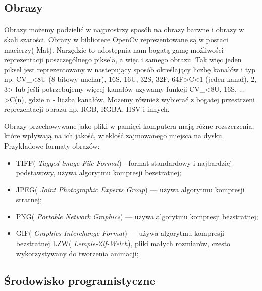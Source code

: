 \documentclass[a4paper,12pt]{article}
\begin{document}
	\subsection{Obrazy}
	    \paragraph{} Obrazy możemy podzielić w najprostrzy sposób na obrazy barwne i obrazy w skali szarości. Obrazy w bibliotece OpenCv reprezentowane są w postaci macierzy( Mat). Narzędzie to udostępnia nam bogatą gamę możliwości reprezentacji poszczególnego piksela, a więc i samego obrazu. Tak więc jeden piksel jest reprezentowany w nastepujący sposób określający liczbę kanałów i typ np. CV\_<8U (8-bitowy unchar), 16S, 16U, 32S, 32F, 64F>C<1 (jeden kanał), 2, 3> lub jeśli potrzebujemy więcej kanałów uzywamy funkcji CV\_<8U, 16S, ... >C(n), gdzie n - liczba kanałów. Możemy również wybierać z bogatej przestrzeni reprezentacji obrazu np. RGB, RGBA, HSV i innych. \par
	    Obrazy przechowywane jako pliki w pamięci komputera mają różne rozszerzenia, które wpływają na ich jakość, wieklość zajmowanego miejsca na dysku. Przykładowe formaty obrazów: 
        
        \begin{spacing}{1}
            \begin{itemize}
	            \item TIFF( \textit{Tagged-lmage File Format}) - format standardowy i najbardziej podstawowy, używa algorytmu kompresji bezstratnej;
	            \item 	JPEG( \textit{Joint Photographic Experts Group}) --- używa algorytmu kompresji stratnej;
	            \item PNG( \textit{Portable Network Graphics}) --- używa algorytmu kompresji bezstratnej; 
                \item  GIF( \textit{Graphics Interchange Format}) --- używa algorytmu kompresji bezstratnej LZW( \textit{Lemple-Zif-Welch}), pliki małych rozmiarów, czesto wykorzystywany do tworzenia animacji;
	        \end{itemize}
	    \end{spacing}
	    
	\subsection{Środowisko programistyczne}
\end{document}
